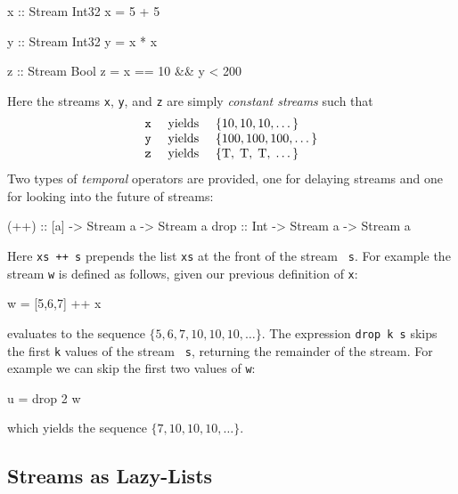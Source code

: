 \begin{code}
x :: Stream Int32
x = 5 + 5

y :: Stream Int32
y = x * x

z :: Stream Bool
z = x == 10 && y < 200
\end{code}

\noindent Here the streams {\tt x}, {\tt y}, and {\tt z} are simply
\emph{constant streams} such that
$$
\begin{array}{rcl}
\mathtt{x} &\textnormal{ yields } &\{10, 10, 10, \dots \}\\
\mathtt{y} &\textnormal{ yields } &\{100, 100, 100,  \dots \}\\
\mathtt{z} &\textnormal{ yields } &\{\mbox{T},\; \mbox{T},\; \mbox{T},\; \dots \}
\end{array}
$$
Two types of \emph{temporal} operators are provided, one for delaying streams and one for
looking into the future of streams:
%
\begin{code}
(++) :: [a] -> Stream a -> Stream a
drop :: Int -> Stream a -> Stream a
\end{code}
%
Here {\tt xs ++ s} prepends the list {\tt xs} at the front of the stream {\tt
  s}.  For example the stream {\tt w} is defined as follows, given our previous
definition of {\tt x}:
%
\begin{code}
w = [5,6,7] ++ x
\end{code}
%
evaluates to the sequence
$\{5, 6, 7, 10, 10, 10, \dots\}$.
The expression {\tt drop k s} skips the first {\tt k} values of the stream {\tt
  s}, returning the remainder of the stream.  
For example we can skip the first two values of {\tt w}:
%
\begin{code}
u = drop 2 w
\end{code}
%
which yields the sequence
$\{7, 10, 10, 10, \dots\}$.

\subsection{Streams as Lazy-Lists} \label{sec:stream}

